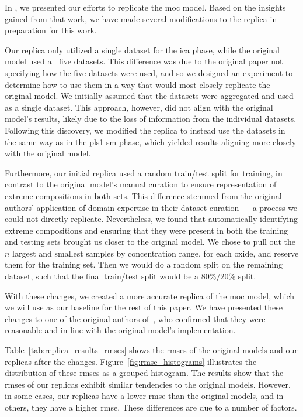 In \citet{p9_paper}, we presented our efforts to replicate the \gls{moc} model.
Based on the insights gained from that work, we have made several modifications to the replica in preparation for this work.

Our replica only utilized a single dataset for the \gls{ica} phase, while the original model used all five datasets.
This difference was due to the original paper not specifying how the five datasets were used, and so we designed an experiment to determine how to use them in a way that would most closely replicate the original model.
We initially assumed that the datasets were aggregated and used as a single dataset.
This approach, however, did not align with the original model's results, likely due to the loss of information from the individual datasets.
Following this discovery, we modified the replica to instead use the datasets in the same way as in the \gls{pls1-sm} phase, which yielded results aligning more closely with the original model.

Furthermore, our initial replica used a random train/test split for training, in contrast to the original model's manual curation to ensure representation of extreme compositions in both sets.
This difference stemmed from the original authors' application of domain expertise in their dataset curation --- a process we could not directly replicate.
Nevertheless, we found that automatically identifying extreme compositions and ensuring that they were present in both the training and testing sets brought us closer to the original model.
We chose to pull out the $n$ largest and smallest samples by concentration range, for each oxide, and reserve them for the training set.
Then we would do a random split on the remaining dataset, such that the final train/test split would be a $80\%/20\%$ split.

With these changes, we created a more accurate replica of the \gls{moc} model, which we will use as our baseline for the rest of this paper.
We have presented these changes to one of the original authors of~\citet{cleggRecalibrationMarsScience2017}, who confirmed that they were reasonable and in line with the original model's implementation.

Table~\ref{tab:replica_results_rmses} shows the \gls{rmse}s of the original models and our replicas after the changes.
Figure~\ref{fig:rmse_histograms} illustrates the distribution of these \gls{rmse}s as a grouped histogram.
The results show that the \gls{rmse}s of our replicas exhibit similar tendencies to the original models.
However, in some cases, our replicas have a lower \gls{rmse} than the original models, and in others, they have a higher \gls{rmse}.
These differences are due to a number of factors.


